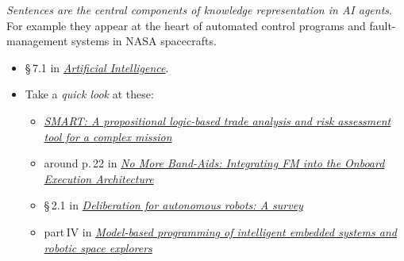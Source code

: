 \documentclass[
  a4paper,
  DIV=11,
  numbers=noendperiod,
  oneside]{scrreprt}
\providecommand{\tightlist}{%
  \setlength{\itemsep}{0pt}\setlength{\parskip}{0pt}}\usepackage{longtable,booktabs,array}
\begin{document}
\emph{Sentences are the central components of knowledge representation
in AI agents}. For example they appear at the heart of automated control
programs and fault-management systems in NASA spacecrafts.


\begin{tcolorbox}[enhanced jigsaw, breakable, arc=.35mm, colframe=quarto-callout-caution-color-frame, bottomtitle=1mm, leftrule=.75mm, opacityback=0, left=2mm, bottomrule=.15mm, toptitle=1mm, opacitybacktitle=0.6, toprule=.15mm, title={\faIcon{book} Reading}, rightrule=.15mm, coltitle=black, titlerule=0mm, colbacktitle=quarto-callout-caution-color!10!white, colback=white]

\begin{itemize}
\tightlist
\item
  §\,7.1 in
  \href{https://hvl.instructure.com/courses/25074/modules/items/660089}{\emph{Artificial
  Intelligence}}.
\item
  Take a \emph{quick look} at these:

  \begin{itemize}
  \tightlist
  \item
    \href{https://hdl.handle.net/2014/45618}{\emph{SMART: A
    propositional logic-based trade analysis and risk assessment tool
    for a complex mission}}
  \item
    around p.\,22 in
    \href{https://www.nasa.gov/sites/default/files/637606main_day_1-michel_ingham.pdf}{\emph{No
    More Band-Aids: Integrating FM into the Onboard Execution
    Architecture}}
  \item
    §\,2.1 in
    \href{http://doi.org/10.1016/j.artint.2014.11.003}{\emph{Deliberation
    for autonomous robots: A survey}}
  \item
    part\,IV in
    \href{https://hvl.instructure.com/courses/25074/modules/items/668587}{\emph{Model-based
    programming of intelligent embedded systems and robotic space
    explorers}}
  \end{itemize}
\end{itemize}

\end{tcolorbox}
\end{document}
